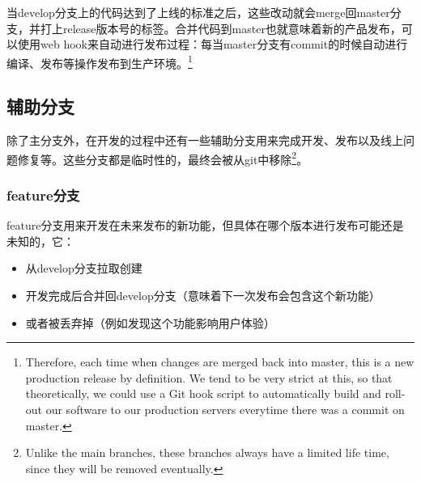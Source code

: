 \documentclass[12pt]{article}
\begin{document}
当develop分支上的代码达到了上线的标准之后，这些改动就会merge回master分支，并打上release版本号的标签。合并代码到master也就意味着新的产品发布，可以使用web hook来自动进行发布过程：每当master分支有commit的时候自动进行编译、发布等操作发布到生产环境。\footnote{Therefore, each time when changes are merged back into master, this is a new production release by definition. We tend to be very strict at this, so that theoretically, we could use a Git hook script to automatically build and roll-out our software to our production servers everytime there was a commit on master.}

\subsection{辅助分支}\label{ux8f85ux52a9ux5206ux652f}

除了主分支外，在开发的过程中还有一些辅助分支用来完成开发、发布以及线上问题修复等。这些分支都是临时性的，最终会被从git中移除\footnote{Unlike the main branches, these branches always have a limited life time, since they will be removed eventually.}。

\subsubsection{feature分支}\label{featureux5206ux652f}

feature分支用来开发在未来发布的新功能，但具体在哪个版本进行发布可能还是未知的，它：

\begin{itemize}
\tightlist
\item
  从develop分支拉取创建
\item
  开发完成后合并回develop分支（意味着下一次发布会包含这个新功能）
\item
  或者被丢弃掉（例如发现这个功能影响用户体验）
\end{itemize}

\begin{Shaded}
\begin{Highlighting}[]
\end{Highlighting}
\end{Shaded}

\begin{Shaded}
\begin{Highlighting}[]
\end{Highlighting}
\end{Shaded}
\end{document}
